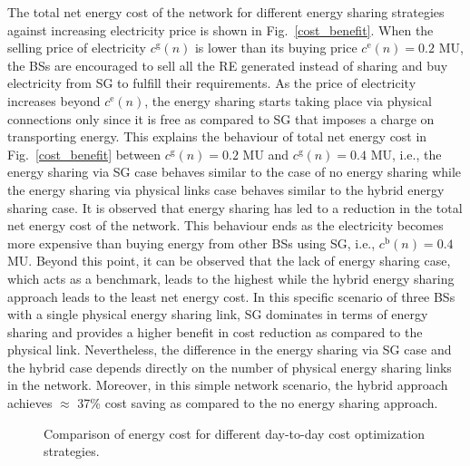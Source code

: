 \documentclass[10pt, letter,twocolumn]{IEEEtran}
\begin{document}
The total net energy cost of the network for different energy sharing strategies against increasing electricity price is shown in Fig.~\ref{cost_benefit}. When the selling price of electricity $c^{\text{g}}(n)$ is lower than its buying price $c^{\text{e}}(n) = 0.2$ MU, the BSs are encouraged to sell all the RE generated instead of sharing and buy electricity from SG to fulfill their requirements. As the price of electricity increases beyond $c^{\text{e}}(n)$, the energy sharing starts taking place via physical connections only since it is free as compared to SG that imposes a charge on transporting energy. This explains the behaviour of total net energy cost in Fig.~\ref{cost_benefit} between $c^{\text{g}}(n) = 0.2$ MU and $c^{\text{g}}(n) = 0.4$ MU, i.e., the energy sharing via SG case behaves similar to the case of no energy sharing while the energy sharing via physical links case behaves similar to the hybrid energy sharing case. It is observed that energy sharing has led to a reduction in the total net energy cost of the network. This behaviour ends as the electricity becomes more expensive than buying energy from other BSs using SG, i.e., $c^{\text{b}}(n) = 0.4$ MU. Beyond this point, it can be observed that the lack of energy sharing case, which acts as a benchmark, leads to the highest while the hybrid energy sharing approach leads to the least net energy cost. In this specific scenario of three BSs with a single physical energy sharing link, SG dominates in terms of energy sharing and provides a higher benefit in cost reduction as compared to the physical link. Nevertheless, the difference in the energy sharing via SG case and the hybrid case depends directly on the number of physical energy sharing links in the network. Moreover, in this simple network scenario, the hybrid approach achieves $\approx$ 37\% cost saving as compared to the no energy sharing approach.
\begin{figure*}[h!]
\begin{center}
\end{center}\vspace{-0.0in}
\caption{Comparison of energy cost for different day-to-day cost optimization strategies.}
\label{Fig_cost_comparison_strategies}\vspace{-0.0in}
\end{figure*}
\end{document}
